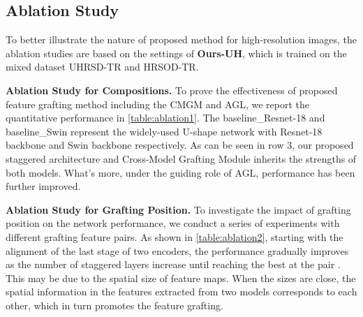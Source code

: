 \documentclass[10pt,twocolumn,letterpaper]{article}
\begin{document}
\subsection{Ablation Study}
To better illustrate the nature of proposed method for high-resolution images, the ablation studies are based on the settings of  \textbf{Ours-UH}, which is trained on the mixed dataset UHRSD-TR and HRSOD-TR.

\textbf{Ablation Study for Compositions.} To prove the effectiveness of proposed feature grafting method including the CMGM and AGL, we report the quantitative performance in \cref{table:ablation1}. The baseline\_Resnet-18 and baseline\_Swin represent the widely-used U-shape network with Resnet-18 backbone and Swin backbone respectively. As can be seen in row 3, our proposed staggered architecture and Cross-Model Grafting Module inherits the strengths of both models. What's more, under the guiding role of AGL, performance has been further improved.





\begin{table}[]
\caption{Performance with the different grafted features.  denotes the th feature of  defined in \cref{subsec:feature extracter}, and  is similar.}
\label{table:ablation2}
\centering
\renewcommand\arraystretch{1}
\end{table}


\textbf{Ablation Study for Grafting Position.}
To investigate the impact of grafting position on the network performance, we conduct a series of experiments with different grafting feature pairs. As shown in \cref{table:ablation2}, starting with the alignment of the last stage of two encoders, the performance gradually improves as the number of staggered layers increase until reaching the best at the pair . This may be due to the spatial size of feature maps. When the sizes are close, the spatial information in the features extracted from two models corresponds to each other, which in turn promotes the feature grafting.
\end{document}
